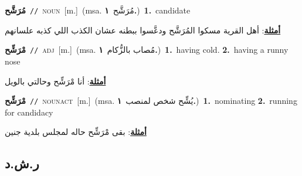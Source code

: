 \documentclass[10pt,a4paper,twoside]{article} %
\begin{document}
\begin{multicols}{2}
{\setlength\topsep{0pt}\textbf{\foreignlanguage{arabic}{مُرَشَّح}}\ {\color{gray}\texttt{//}\color{black}}\ \textsc{noun}\ [m.]\ \color{gray}(msa. \foreignlanguage{arabic}{مُرَشَّح}~\foreignlanguage{arabic}{\textbf{١.}})\color{black}\ \textbf{1.}~candidate\  \begin{flushright}\color{gray}\foreignlanguage{arabic}{\textbf{\underline{\foreignlanguage{arabic}{أمثلة}}}: أهل القرية مسكوا المُرَشَّح ودعَّسوا ببطنه عشان الكذب اللي كذبه علسانهم}\end{flushright}\color{black}} \vspace{2mm}

{\setlength\topsep{0pt}\textbf{\foreignlanguage{arabic}{مْرَشِّح}}\ {\color{gray}\texttt{//}\color{black}}\ \textsc{adj}\ [m.]\ \color{gray}(msa. \foreignlanguage{arabic}{مُصاب بالزُّكام}~\foreignlanguage{arabic}{\textbf{١.}})\color{black}\ \textbf{1.}~having cold.  \textbf{2.}~having a runny nose\  \begin{flushright}\color{gray}\foreignlanguage{arabic}{\textbf{\underline{\foreignlanguage{arabic}{أمثلة}}}: أنا مْرَشِّح وحالتي بالويل}\end{flushright}\color{black}} \vspace{2mm}

{\setlength\topsep{0pt}\textbf{\foreignlanguage{arabic}{مْرَشِّح}}\ {\color{gray}\texttt{//}\color{black}}\ \textsc{noun\textunderscore act}\ [m.]\ \color{gray}(msa. \foreignlanguage{arabic}{يُشِّح شخص لمنصب}~\foreignlanguage{arabic}{\textbf{١.}})\color{black}\ \textbf{1.}~nominating  \textbf{2.}~running for candidacy\  \begin{flushright}\color{gray}\foreignlanguage{arabic}{\textbf{\underline{\foreignlanguage{arabic}{أمثلة}}}: بقى مْرَشِّح حاله لمجلس بلدية جنين}\end{flushright}\color{black}} \vspace{2mm}

\vspace{-3mm}
\subsection*{\color{blue}\foreignlanguage{arabic}{ر.ش.د}\color{blue}{}} 


\end{multicols}
\end{document}
